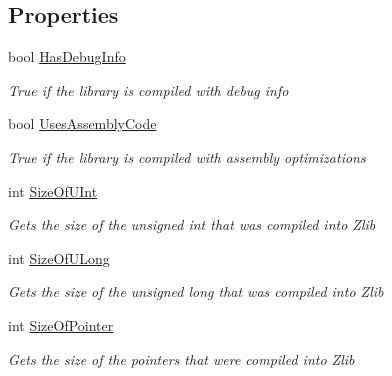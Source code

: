 \subsection*{Properties}
\begin{DoxyCompactItemize}
\item 
bool \hyperlink{class_dot_z_lib_1_1_info_aa35f5491fb48ddc389bd75d73993c017}{Has\+Debug\+Info}
\begin{DoxyCompactList}\small\item\em True if the library is compiled with debug info \end{DoxyCompactList}\item 
bool \hyperlink{class_dot_z_lib_1_1_info_af40b6921a94f038094510d56e11a93e5}{Uses\+Assembly\+Code}
\begin{DoxyCompactList}\small\item\em True if the library is compiled with assembly optimizations \end{DoxyCompactList}\item 
int \hyperlink{class_dot_z_lib_1_1_info_ad1144085a3156ff5f2a4f8eca5e0b8af}{Size\+Of\+U\+Int}
\begin{DoxyCompactList}\small\item\em Gets the size of the unsigned int that was compiled into Zlib \end{DoxyCompactList}\item 
int \hyperlink{class_dot_z_lib_1_1_info_a1367f8d9234f03365f4431bc72cd3f26}{Size\+Of\+U\+Long}
\begin{DoxyCompactList}\small\item\em Gets the size of the unsigned long that was compiled into Zlib \end{DoxyCompactList}\item 
int \hyperlink{class_dot_z_lib_1_1_info_ae661fa84df8c5d876c2baa8e7343816e}{Size\+Of\+Pointer}
\begin{DoxyCompactList}\small\item\em Gets the size of the pointers that were compiled into Zlib \end{DoxyCompactList}\item 

\end{DoxyCompactItemize}

